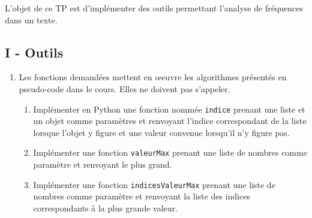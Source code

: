 L'objet de ce TP est d'implémenter des outils permettant l'analyse de fréquences dans un texte.
\subsection*{I - Outils}
\begin{enumerate}
  \item Les fonctions demandées mettent en \oe{}euvre les algorithmes présentés en pseudo-code dans le cours. Elles ne doivent pas s'appeler.
\begin{enumerate}
  \item Implémenter en Python une fonction nommée \verb|indice| prenant une liste et un objet comme paramètres et renvoyant l'indice correspondant de la liste lorsque l'objet y figure et une valeur convenue lorsqu'il n'y figure pas.
  \item Implémenter une fonction \texttt{valeurMax} prenant une liste de nombres comme paramètre et renvoyant le plus grand.
  \item Implémenter une fonction \texttt{indicesValeurMax} prenant une liste de nombres comme paramètre et renvoyant la liste des indices correspondants à la plus grande valeur.   
\end{enumerate}
   

\end{enumerate}
